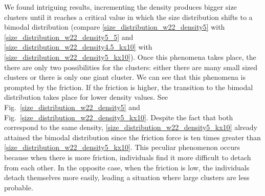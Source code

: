 We found intriguing results, incrementing the density produces bigger size clusters until it reaches a critical value in which the size distribution shifts to a bimodal distribution (compare \ref{size_distribution_w22_density5} with \ref{size_distribution_w22_density5_5} and \ref{size_distribution_w22_density4.5_kx10} with \ref{size_distribution_w22_density5_kx10}). Once this phenomena takes place, the there are only two possibilities for the clusters: either there are many small sized clusters or there is only one giant cluster. We can see that this phenomena is prompted by the friction. If the friction is higher, the transition to the bimodal distribution takes place for lower density values. See Fig.~\ref{size_distribution_w22_density5} and Fig.~\ref{size_distribution_w22_density5_kx10}. Despite the fact that both correspond to the same density,  \ref{size_distribution_w22_density5_kx10} already attained the bimodal distribution since the friction force is ten times greater than \ref{size_distribution_w22_density5_kx10}. This peculiar phenomenon occurs because when there is more friction, individuals find it more difficult to detach from each other. In the opposite case, when the friction is low, the individuals detach themselves more easily, leading a situation where large clusters are less probable.

